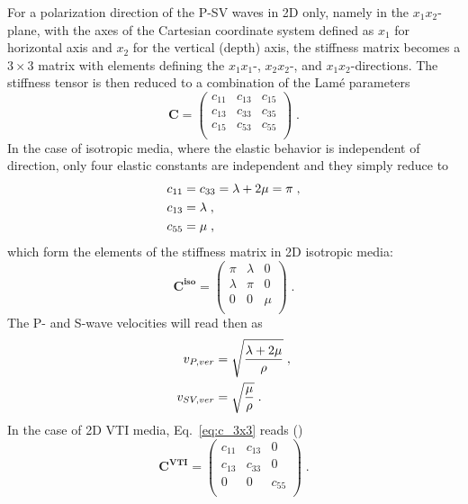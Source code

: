 For a polarization direction of the P-SV waves in 2D only, namely in the $x_1x_2$-plane, with the axes of the Cartesian coordinate system defined as $x_1$ for horizontal axis and $x_2$ for the vertical (depth) axis, the stiffness matrix becomes a $3 \times 3$ matrix with elements defining the $x_1x_1$-, $x_2x_2$-, and $x_1x_2$-directions. The stiffness tensor is then reduced to a combination of the Lam\'e parameters
\begin{equation}
    \mathbf{C} =
    \begin{pmatrix}
    c_{11} & c_{13} & c_{15} \\
    c_{13} & c_{33} & c_{35} \\
    c_{15} & c_{53} & c_{55} \\
    \end{pmatrix}\;.
    \label{eq:c_3x3}
\end{equation}
In the case of isotropic media, where the elastic behavior is independent of direction, only four elastic constants are independent and they simply reduce to
\begin{subequations}
\allowdisplaybreaks
    \begin{align}
        c_{11} &= c_{33}=\lambda+2\mu = \pi\;,\\
        c_{13} &= \lambda\;,\\
        c_{55} &= \mu\;,
    \end{align}
    \label{eq:c_iso_ij}
\end{subequations}
which form the elements of the stiffness matrix in 2D isotropic media:
\begin{equation}
    \mathbf{C}^\mathbf{iso} =
    \begin{pmatrix}
    \pi & \lambda & 0 \\
    \lambda & \pi & 0 \\
    0 & 0 & \mu \\
    \end{pmatrix}\;.
    \label{eq:c_iso_3x3}
\end{equation}
The P- and S-wave velocities will read then as
\begin{subequations}
\allowdisplaybreaks
    \begin{align}
        v_{P,ver} &= \sqrt{\frac{\lambda+2\mu}{\rho}}\;,\\
        v_{SV,ver} &= \sqrt{\frac{\mu}{\rho}}\;.
    \end{align}
\end{subequations}
In the case of 2D VTI media, Eq.~\ref{eq:c_3x3} reads (\cite{Thomsen:86})
\begin{equation}
    \mathbf{C}^\mathbf{VTI} =
    \begin{pmatrix}
    c_{11} & c_{13} & 0 \\
    c_{13} & c_{33} & 0 \\
    0 & 0 & c_{55} \\
    \end{pmatrix}\;.
    \label{eq:c_vti_3x3}
\end{equation}
